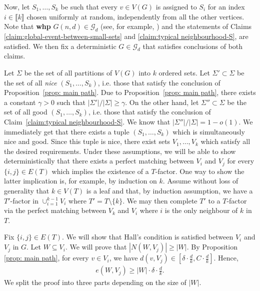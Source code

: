 \documentclass[notitlepage]{scrartcl}
\newcommand{\br}[1]{\llbracket{#1}\rrbracket}
\begin{document}
Now, let $S_1,\ldots, S_k$ be such that every $v\in V(G)$ is assigned to $S_i$ for an index $i\in \br{k}$ chosen uniformly at random, independently from all the other vertices. Note that \textbf{whp} $G(n,d)\in \mathcal{G}_d$ (see, for example, \cite{W99}) and the statements of Claims \ref{claim:global-event-between-small-sets} and \ref{claim:typical neighbourhood-S}, are satisfied. We then fix a deterministic $G\in \mathcal{G}_d$ that satisfies conclusions of both claims.

Let $\Sigma$ be the set of all partitions of $V(G)$ into $k$ ordered sets. Let $\Sigma'\subset\Sigma$ be the set of all \emph{nice} $(S_1,\ldots,S_k)$, i.e. those that satisfy the conclusion of Proposition~\ref{prop: main path}. Due to Proposition~\ref{prop: main path}, there exists a constant $\gamma>0$ such that $|\Sigma'|/|\Sigma|\geq\gamma$. On the other hand, let $\Sigma''\subset\Sigma$ be the set of all good $(S_1,\ldots,S_k)$, i.e. those that satisfy the conclusion of Claim~\ref{claim:typical neighbourhood-S}. We know that $|\Sigma''|/|\Sigma|=1-o(1)$. We immediately get that there exists a tuple $(S_1,\ldots,S_k)$ which is simultaneously nice and good. Since this tuple is nice,
 there exist sets $V_1, \dots, V_k$ which satisfy all the desired requirements. Under these assumptions, we will be able to show deterministically that there exists a perfect matching between $V_i$ and $V_j$ for every $\{i,j\} \in E(T)$ which implies the existence of a $T$-factor. One way to show the latter implication is, for example, by induction on $k$. Assume without loss of generality that $k \in V(T)$ is a leaf and that, by induction assumption, we have a $T'$-factor in $\cup_{i=1}^{k-1} V_i$ where $T' = T \setminus \{k\}$. We may then complete $T'$ to a $T$-factor via the perfect matching between $V_k$ and $V_i$ where $i$ is the only neighbour of $k$ in $T$.

Fix $\{i,j\} \in E(T)$. We will show that Hall's condition is satisfied between $V_i$ and $V_j$ in $G$. Let $W \subseteq V_i$. We will prove that $|N(W, V_j)| \ge |W|$. By Proposition \ref{prop: main path}, for every $v \in V_i$, we have $d(v, V_j) \in \left[\delta \cdot \frac{d}{k}, C \cdot \frac{d}{k}\right]$. Hence, 
\begin{align}\label{eq:W-A_j-edges}
    e(W, V_j) \ge |W| \cdot \delta \cdot \frac{d}{k}.
\end{align}
We split the proof into three parts depending on the size of $|W|$.
\end{document}
